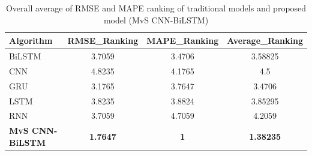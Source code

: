 \documentclass[a4paper,fleqn]{cas-dc}
\begin{document}
\begin{table}[!htp]
  \caption{Overall average of RMSE and MAPE ranking of traditional models and proposed model (MvS CNN-BiLSTM)}
  \centering
  \begin{tabular}{lccc}
  \hline
  Algorithm&RMSE\_Ranking&MAPE\_Ranking&Average\_Ranking\\\hline
  BiLSTM&3.7059&3.4706&3.58825\\
  CNN&4.8235&4.1765&4.5\\
  GRU&3.1765&3.7647&3.4706\\
  LSTM&3.8235&3.8824&3.85295\\
  RNN&3.7059&4.7059&4.2059\\
  \textbf{MvS CNN-BiLSTM}&\textbf{1.7647}&\textbf{1}&\textbf{1.38235} \\\hline
\end{tabular}
\label{AVG RANK}
  \end{table}
\end{document}
